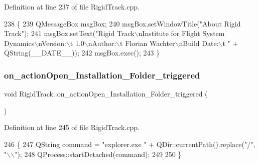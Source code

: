 Definition at line 237 of file Rigid\+Track.\+cpp.


\begin{DoxyCode}
238 \{
239     QMessageBox msgBox;
240     msgBox.setWindowTitle(\textcolor{stringliteral}{"About Rigid Track"});
241     msgBox.setText(\textcolor{stringliteral}{"Rigid Track\(\backslash\)nInstitute for Flight System Dynamics\(\backslash\)nVersion:\(\backslash\)t 1.0\(\backslash\)nAuthor:\(\backslash\)t Florian
       Wachter\(\backslash\)nBuild Date:\(\backslash\)t "} + QString(\_\_DATE\_\_));
242     msgBox.exec();
243 \}
\end{DoxyCode}
\mbox{\label{class_rigid_track_a7d858fcf6c9fe852ee3facfe6588aec1}} 
\subsubsection{\texorpdfstring{on\+\_\+action\+Open\+\_\+\+Installation\+\_\+\+Folder\+\_\+triggered}{on\_actionOpen\_Installation\_Folder\_triggered}}
{\footnotesize\ttfamily void Rigid\+Track\+::on\+\_\+action\+Open\+\_\+\+Installation\+\_\+\+Folder\+\_\+triggered (\begin{DoxyParamCaption}{ }\end{DoxyParamCaption})\hspace{0.3cm}{\ttfamily [slot]}}



Definition at line 245 of file Rigid\+Track.\+cpp.


\begin{DoxyCode}
246 \{
247     QString command = \textcolor{stringliteral}{"explorer.exe "} + QDir::currentPath().replace(\textcolor{stringliteral}{"/"}, \textcolor{stringliteral}{"\(\backslash\)\(\backslash\)"});
248     QProcess::startDetached(command);
249     
250 \}
\end{DoxyCode}
\mbox{\label{class_rigid_track_a63a85d33ef48741b0e671ebbbd43083a}} 
